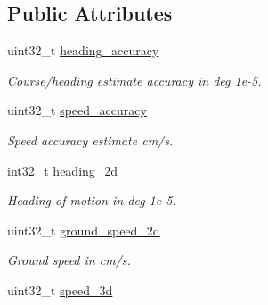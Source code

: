 \subsection*{Public Attributes}
\begin{DoxyCompactItemize}
\item 
\hypertarget{structubx__nav__vel__ned__t_aa11b82785885a8e79e58218ab5b20786}{uint32\+\_\+t \hyperlink{structubx__nav__vel__ned__t_aa11b82785885a8e79e58218ab5b20786}{heading\+\_\+accuracy}}\label{structubx__nav__vel__ned__t_aa11b82785885a8e79e58218ab5b20786}

\begin{DoxyCompactList}\small\item\em Course/heading estimate accuracy in deg 1e-\/5. \end{DoxyCompactList}\item 
\hypertarget{structubx__nav__vel__ned__t_a4ba39a83805f2388a56dfb26da6c610d}{uint32\+\_\+t \hyperlink{structubx__nav__vel__ned__t_a4ba39a83805f2388a56dfb26da6c610d}{speed\+\_\+accuracy}}\label{structubx__nav__vel__ned__t_a4ba39a83805f2388a56dfb26da6c610d}

\begin{DoxyCompactList}\small\item\em Speed accuracy estimate cm/s. \end{DoxyCompactList}\item 
\hypertarget{structubx__nav__vel__ned__t_a86200b9c9ab44118f0a0283bca4feff4}{int32\+\_\+t \hyperlink{structubx__nav__vel__ned__t_a86200b9c9ab44118f0a0283bca4feff4}{heading\+\_\+2d}}\label{structubx__nav__vel__ned__t_a86200b9c9ab44118f0a0283bca4feff4}

\begin{DoxyCompactList}\small\item\em Heading of motion in deg 1e-\/5. \end{DoxyCompactList}\item 
\hypertarget{structubx__nav__vel__ned__t_a61a2e5b8bb036dc4ad824ba0458e3adf}{uint32\+\_\+t \hyperlink{structubx__nav__vel__ned__t_a61a2e5b8bb036dc4ad824ba0458e3adf}{ground\+\_\+speed\+\_\+2d}}\label{structubx__nav__vel__ned__t_a61a2e5b8bb036dc4ad824ba0458e3adf}

\begin{DoxyCompactList}\small\item\em Ground speed in cm/s. \end{DoxyCompactList}\item 
\hypertarget{structubx__nav__vel__ned__t_aa1c9f82f463cc151cdbf2c9d2bace527}{uint32\+\_\+t \hyperlink{structubx__nav__vel__ned__t_aa1c9f82f463cc151cdbf2c9d2bace527}{speed\+\_\+3d}}\label{structubx__nav__vel__ned__t_aa1c9f82f463cc151cdbf2c9d2bace527}


\end{DoxyCompactItemize}
